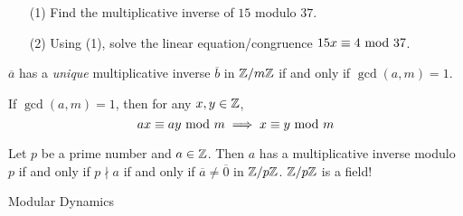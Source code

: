 \vspace*{0.5em}

\begin{example}[in-class]\hfill
\begin{itemize}
\item[(1)] Find the multiplicative inverse of $15$ modulo $37$.
\item[(2)] Using (1), solve the linear equation/congruence $15x \equiv 4\text{ mod }{37}$.
\end{itemize}
\end{example}

\vspace*{1em}

\begin{corollary}
$\overline{a}$ has a \emph{unique} multiplicative inverse $\overline{b}$ in $\mathbb Z/m\mathbb Z$ if and only if $\gcd(a,m) = 1$.
\end{corollary}

\vspace*{1em}

\begin{corollary}\label{cancel}
If $\gcd(a,m) = 1$, then for any $x,y \in \mathbb Z$,
\[ax\equiv ay\text{ mod }{m} \implies x\equiv y \text{ mod }{m}\]
\end{corollary}

\vspace*{1em}

\begin{corollary}\label{primeinv}
Let $p$ be a prime number and $a \in \mathbb Z$. Then $a$ has a multiplicative inverse modulo $p$ if and only if $p\nmid a$ if and only if $\overline{a} \neq \overline{0}$ in $\mathbb Z/p\mathbb Z$. $\mathbb Z/p\mathbb Z$ is a field!
\end{corollary}

\vspace*{2.5em}

\begin{center}
{\Large Modular Dynamics}
\end{center}

